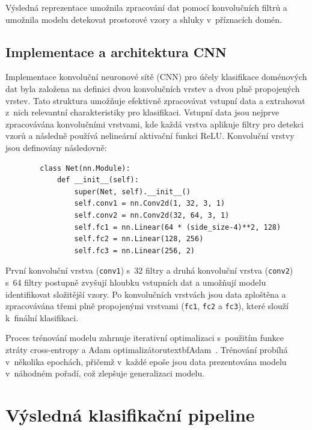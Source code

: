 Výsledná reprezentace umožnila zpracování dat pomocí konvolučních filtrů a umožnila modelu detekovat prostorové vzory a shluky v~příznacích domén.


\subsection{Implementace a architektura CNN}

Implementace konvoluční neuronové sítě (CNN) pro účely klasifikace doménových dat byla založena na definici dvou konvolučních vrstev a dvou plně propojených vrstev. Tato struktura umožňuje efektivně zpracovávat vstupní data a extrahovat z~nich relevantní charakteristiky pro klasifikaci. Vstupní data jsou nejprve zpracovávána konvolučními vrstvami, kde každá vrstva aplikuje filtry pro detekci vzorů a následně používá nelineární aktivační funkci ReLU. Konvoluční vrstvy jsou definovány následovně:

\begin{samepage}
    \begin{verbatim}
        class Net(nn.Module):
            def __init__(self):
                super(Net, self).__init__()
                self.conv1 = nn.Conv2d(1, 32, 3, 1)
                self.conv2 = nn.Conv2d(32, 64, 3, 1)
                self.fc1 = nn.Linear(64 * (side_size-4)**2, 128)
                self.fc2 = nn.Linear(128, 256)
                self.fc3 = nn.Linear(256, 2)
    \end{verbatim}
\end{samepage}

První konvoluční vrstva (\texttt{conv1}) s~32 filtry a druhá konvoluční vrstva (\texttt{conv2}) s~64 filtry postupně zvyšují hloubku vstupních dat a umožňují modelu identifikovat složitější vzory. Po konvolučních vrstvách jsou data zploštěna a zpracovávána třemi plně propojenými vrstvami (\texttt{fc1}, \texttt{fc2}  a \texttt{fc3}), které slouží k~finální klasifikaci. 

Proces trénování modelu zahrnuje iterativní optimalizaci s~použitím funkce ztráty cross-entropy a Adam optimalizátorutextbf{Adam}~\cite{kingma2014adam}. Trénování probíhá v~několika epochách, přičemž v~každé epoše jsou data prezentována modelu v~náhodném pořadí, což zlepšuje generalizaci modelu.



\section{Výsledná klasifikační pipeline}
\label{sec:final_pipeline}

